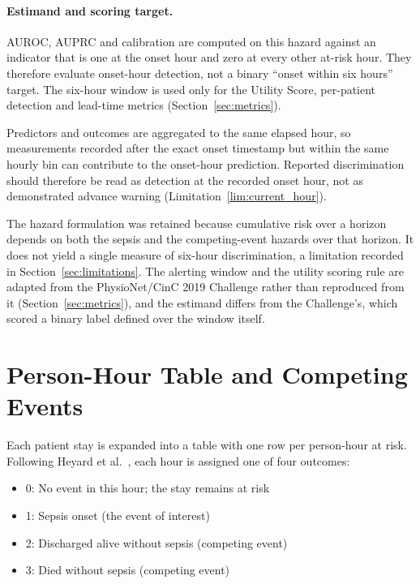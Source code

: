 \paragraph{Estimand and scoring target.} AUROC, AUPRC and calibration are
computed on this hazard against an indicator that is one at the onset hour and
zero at every other at-risk hour. They therefore evaluate onset-hour
detection, not a binary ``onset within six hours'' target. The six-hour window
is used only for the Utility Score, per-patient detection and lead-time
metrics (Section~\ref{sec:metrics}).

Predictors and outcomes are aggregated to the same elapsed hour, so
measurements recorded after the exact onset timestamp but within the same
hourly bin can contribute to the onset-hour prediction. Reported
discrimination should therefore be read as detection at the recorded onset
hour, not as demonstrated advance warning (Limitation~\ref{lim:current_hour}).

The hazard formulation was retained because cumulative risk over a horizon
depends on both the sepsis and the competing-event hazards over that horizon.
It does not yield a single measure of six-hour discrimination, a limitation
recorded in Section~\ref{sec:limitations}. The alerting window and the utility
scoring rule are adapted from the PhysioNet/CinC 2019 Challenge
\cite{reyna2020utility} rather than reproduced from it
(Section~\ref{sec:metrics}), and the estimand differs from the Challenge's,
which scored a binary label defined over the window itself.


\section{Person-Hour Table and Competing Events}
\label{sec:person_hours}

Each patient stay is expanded into a table with one row per person-hour at
risk. Following Heyard et al.\ \cite{heyard2019dynamic}, each hour is
assigned one of four outcomes:

\begin{itemize}
    \item 0: No event in this hour; the stay remains at risk
    \item 1: Sepsis onset (the event of interest)
    \item 2: Discharged alive without sepsis (competing event)
    \item 3: Died without sepsis (competing event)
\end{itemize}

